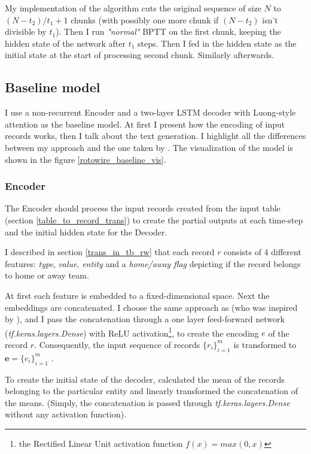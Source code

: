 My implementation of the algorithm cuts the original sequence of size $N$ to $( N - t_2 ) / t_1 + 1$ chunks (with possibly one more chunk if $(N - t_2)$ isn't divisible by $t_1$). Then I run \emph{"normal"} BPTT on the first chunk, keeping the hidden state of the network after $t_1$ steps. Then I fed in the hidden state as the initial state at the start of processing second chunk. Similarly afterwards.

\subsection{Baseline model} \label{sec_baseline_model_rotowire}

I use a non-recurrent Encoder and a two-layer LSTM decoder with Luong-style attention as the baseline model. At first I present how the encoding of input records works, then I talk about the text generation. I highlight all the differences between my approach and the one taken by \citep{wiseman2017}. The visualization of the model is shown in the figure \ref{rotowire_baseline_vis}.

\subsubsection{Encoder}

The Encoder should process the input records created from the input table (section \ref{table_to_record_trans}) to create the partial outputs at each time-step and the initial hidden state for the Decoder.

I described in section \ref{trans_in_tb_rw} that each record $r$ consists of 4 different features: \emph{type}, \emph{value}, \emph{entity} and a \emph{home/away flag} depicting if the record belongs to home or away team.

At first each feature is embedded to a fixed-dimensional space. Next the embeddings are concatenated. I choose the same approach as \citep{wiseman2017} (who was inspired by \citep{yang2016referenceaware}), and I pass the concatenation through a one layer feed-forward network (\emph{tf.keras.layers.Dense}) with ReLU activation\footnote{the Rectified Linear Unit activation function $f(x) = max(0, x)$}, to create the encoding $e$ of the record $r$. Consequently, the input sequence of records $\{r_i\}_{i=1}^m$ is transformed to $\mathbf{e} = \{ e_i \}_{i=1}^m$ .

To create the initial state of the decoder, \citep{wiseman2017} calculated the mean of the records belonging to the particular entity and linearly transformed the concatenation of the means. (Simply, the concatenation is passed through \emph{tf.keras.la\-yers.Dense} without any activation function).

